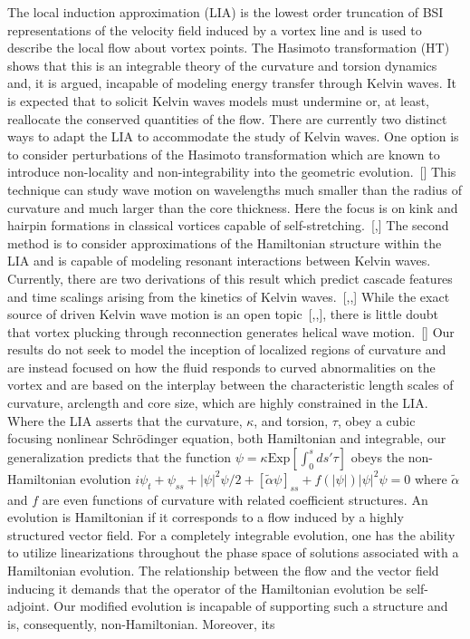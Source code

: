 \documentclass[aps,graphicx,reprint,onecolumn,12pt,tightenlines,longbibliography]{revtex4-1}
\newcommand{\sas}[2]{{#2}}
\begin{document}
The local induction approximation (LIA) is the lowest order truncation of BSI representations of the velocity field induced by a vortex line and is used to describe the local flow about vortex points.  The Hasimoto transformation (HT) shows that this is an integrable theory of the curvature and torsion dynamics and, it is argued, incapable of modeling energy transfer through Kelvin waves. It is expected that to solicit Kelvin waves models must undermine or, at least, reallocate the conserved quantities of the flow. There are currently two distinct ways to adapt the LIA to accommodate the study of Kelvin waves. One option is to consider perturbations of the Hasimoto transformation which are known to introduce non-locality and non-integrability into the geometric evolution.~[] This technique can study wave motion on wavelengths much smaller than the radius of curvature and much larger than the core thickness. Here the focus is on  kink and hairpin formations in classical vortices capable of self-stretching.~[,] The second method is to consider approximations of the Hamiltonian structure within the LIA and is capable of modeling resonant interactions between Kelvin waves. Currently, there are two derivations of this result which predict cascade features and time scalings arising from the kinetics of Kelvin waves.~[,,]  While the exact source of driven Kelvin wave motion is an open topic~[,,], there is little doubt that vortex plucking through reconnection generates helical wave motion.~[] Our results do not seek to model the inception of localized regions of curvature and are instead focused on how the fluid responds to curved abnormalities on the vortex\sas{.}{ and are based on the interplay between the characteristic length scales of curvature, arclength and core size, which are highly constrained in the LIA.} Where the LIA asserts that the curvature, $\kappa$, and torsion, $\tau$, obey a cubic focusing nonlinear Schr\"odinger equation, \sas{}{both Hamiltonian and integrable}, our generalization predicts that the function $\psi = \kappa \mbox{Exp}[\int_{0}^{s}ds' \tau]$ obeys the non-Hamiltonian evolution  $i\psi_{t}+\psi_{ss} + |\psi|^{2} \psi/2 + \left[\tilde{\alpha} \psi\right]_{ss} + f(|\psi|)|\psi|^{2}\psi =0$ where $\tilde{\alpha}$ and $f$ are even functions of curvature with related coefficient structures. \sas{}{An evolution is Hamiltonian if it corresponds to a flow induced by a highly structured vector field. For a completely integrable evolution, one has the ability to utilize linearizations throughout the phase space of solutions associated with a Hamiltonian evolution.  The relationship between the flow and the vector field \sas{which induces}{inducing} it demands that the operator of the Hamiltonian evolution be self-adjoint. Our modified evolution is incapable of supporting such a structure and is, consequently, non-Hamiltonian.} \sas{This}{Moreover, its} 
\end{document}
